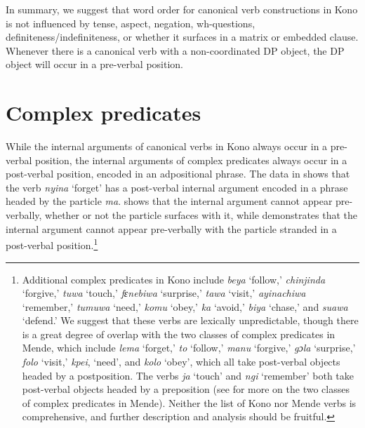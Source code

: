 \documentclass[output=paper,colorlinks,citecolor=brown,draftmode
]{langscibook}
\begin{document}
In summary, we suggest that word order for canonical verb constructions in Kono is not influenced by tense, aspect, negation, wh-questions, definiteness/indefiniteness, or whether it surfaces in a matrix or embedded clause. Whenever there is a canonical verb with a non-coordinated DP object, the DP object will occur in a pre-verbal position. 



\section{Complex predicates} 
\label{sec:Complex Predicates}

While the internal arguments of canonical verbs in Kono always occur in a pre-verbal position, the internal arguments of complex predicates always occur in a post-verbal position, encoded in an adpositional phrase. The data in  shows that the verb \textit{nyina} ‘forget’ has a post-verbal internal argument encoded in a phrase headed by the particle \textit{ma}.  shows that the internal argument cannot appear pre-verbally, whether or not the particle surfaces with it, while  demonstrates that the internal argument cannot appear pre-verbally with the particle stranded in a post-verbal position.\footnote{Additional complex predicates in Kono include \textit{beya} ‘follow,’ \textit{chinjinda} ‘forgive,’ \textit{tuwa} ‘touch,’ \textit{fɛnebiwa} ‘surprise,’ \textit{tawa} ‘visit,’ \textit{ayinachiwa} ‘remember,’ \textit{tumuwa} ‘need,’ \textit{komu} ‘obey,’ \textit{ka} ‘avoid,’  \textit{biya} ‘chase,’ and \textit{suawa} ‘defend.’ We suggest that these verbs are lexically unpredictable, though there is a great degree of overlap with the two classes of complex predicates in Mende, which include \textit{lema} ‘forget,’ \textit{to} ‘follow,’ \textit{manu} ‘forgive,’ \textit{gɔla} ‘surprise,’ \textit{folo} ‘visit,’ \textit{kpei}, ‘need’, and \textit{kolo} ‘obey’, which all take post-verbal objects headed by a postposition. The verbs \textit{ja} ‘touch’ and \textit{ngi} ‘remember’ both take post-verbal objects headed by a preposition (see \citealt{SmithCLS, SmithDiss} for more on the two classes of complex predicates in Mende). Neither the list of Kono nor Mende verbs is comprehensive, and further description and analysis should be fruitful.}
\end{document}
